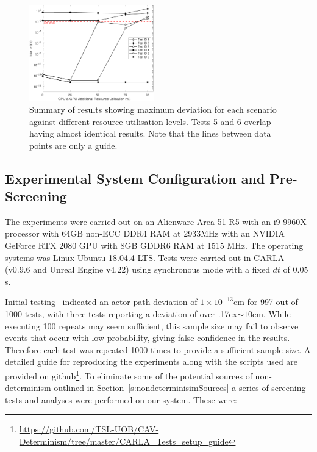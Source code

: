 \documentclass[letterpaper, 10 pt, journal, twoside]{IEEEtran}
\begin{document}
\begin{figure}[t]
    \centering
    \includegraphics[width=0.48\textwidth]{Other/Figures/ExperimentsStressSummaryV6.pdf}
    \caption{Summary of results showing maximum deviation for each scenario against different resource utilisation levels. Tests 5 and 6 overlap having almost identical results. Note that the lines between data points are only a guide.}
    \label{ExperimentsStressSummary}
\end{figure}
	
\subsection{Experimental System Configuration and Pre-Screening}\label{s:screening}
The experiments were carried out on an Alienware Area 51 R5 with an i9 9960X processor with 64GB non-ECC DDR4 RAM at 2933MHz with an NVIDIA GeForce RTX 2080 GPU with 8GB GDDR6 RAM at 1515 MHz. 
%
The operating systems was Linux Ubuntu 18.04.4 LTS. 
%
Tests were carried out in CARLA (v0.9.6 and Unreal Engine v4.22) using synchronous mode with a fixed $dt$ of $0.05$s. 

Initial testing~\cite{TSLUnrealEngineTesting} indicated an actor path deviation of $1\times10^{-13}$cm for 997 out of 1000 tests, with three tests reporting a deviation of over {\raise.17ex\hbox{$\scriptstyle\sim$}}$10$cm. While executing 100 repeats may seem sufficient, this sample size may fail to observe events that occur with low probability, giving false confidence in the results. 
Therefore each test was repeated 1000 times to provide a sufficient sample size.
%
A detailed guide for reproducing the experiments along with the scripts used are provided on github\footnote{\url{https://github.com/TSL-UOB/CAV-Determinism/tree/master/CARLA_Tests_setup_guide}}.
%
To eliminate some of the potential sources of non-determinism outlined in Section~\ref{s:nondeterminisimSources} a series of screening tests and analyses were performed on our system. These were:
\end{document}
